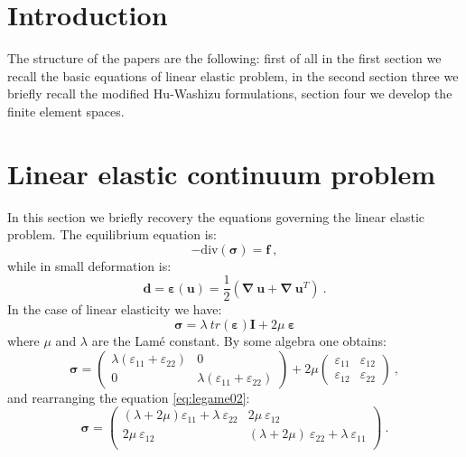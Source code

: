 \documentclass[preprint,12pt,authoryear]{elsarticle}
\begin{document}
\linenumbers
\section{Introduction}\label{sec:one}

The structure of the papers are the following: first of all in the  first section we recall the basic equations of linear elastic problem, in the second section three we briefly recall the modified Hu-Washizu formulations, section four we develop the finite element spaces.

\section{Linear elastic continuum problem}\label{sec:two}
In this section we briefly recovery the equations governing the linear elastic problem. 
The equilibrium equation is:
\begin{equation} \label{eq:equilibrio01}
- \mbox{div}(\bm{\sigma}) = \bm{f}\:,
\end{equation}
while in small deformation is:
\begin{equation}\label{eq:congruenza01}
\bm{d} = \bm{\varepsilon}(\bm{u}) = 
\frac{1}{2}(\bm{\nabla} \: \bm{u} + \bm{\nabla} \: \bm{u}^{T}) \:.
\end{equation}
In the case of linear elasticity we have:
\begin{equation} \label{eq:legame01}
\bm{\sigma} = \lambda \: tr(\bm{\varepsilon}) \bm{I} 
+ 2\mu \: \bm{\varepsilon}
\end{equation}
where $\mu$ and $\lambda$ are the Lamé constant.
By some algebra one obtains:
\begin{equation} \label{eq:legame02}
\bm{\sigma} =
\left(
\begin{array}{cc}
\lambda (\varepsilon_{11} + \varepsilon_{22}) & 0 \\
0 & \lambda (\varepsilon_{11} + \varepsilon_{22}) 
\end{array}
\right) +2\mu
\left(
\begin{array}{cc}
\varepsilon_{11} & \varepsilon_{12} \\
\varepsilon_{12} & \varepsilon_{22}
\end{array}
\right)\:,
\end{equation}
and rearranging the equation \eqref{eq:legame02}:
\begin{equation} \label{eq:legame03}
\bm{\sigma} =
\left(
\begin{array}{ll}
(\lambda+2\mu) \varepsilon_{11} + \lambda \: \varepsilon_{22} & 2\mu \: \varepsilon_{12} \\
2\mu \: \varepsilon_{12} & (\lambda+2\mu) \: \varepsilon_{22} + \lambda \: \varepsilon_{11}  \\
\end{array}
\right)\:.
\end{equation}
\end{document}
